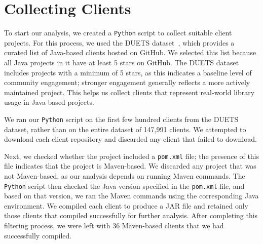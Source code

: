 \section{Collecting Clients}


To start our analysis, we created a \texttt{Python} script to collect suitable client projects. For this process, we used the DUETS dataset~\cite{durieux21:_duets}, which provides a curated list of Java-based clients hosted on GitHub. We selected this list because all Java projects in it have at least 5 stars on GitHub. The DUETS dataset includes projects with a minimum of 5 stars, as this indicates a baseline level of community engagement; stronger engagement generally reflects a more actively maintained project. This helps us collect clients that represent real-world library usage in Java-based projects.



We ran our \texttt{Python} script on the first few hundred clients from the DUETS dataset, rather than on the entire dataset of 147,991 clients. We attempted to download each client repository and discarded any client that failed to download. 

Next, we checked whether the project included a \texttt{pom.xml} file; the presence of this file indicates that the project is Maven-based. We discarded any project that was not Maven-based, as our analysis depends on running Maven commands. The \texttt{Python} script then checked the Java version specified in the \texttt{pom.xml} file, and based on that version, we ran the Maven commands using the corresponding Java environment. We compiled each client to produce a JAR file and retained only those clients that compiled successfully for further analysis. After completing this filtering process, we were left with 36 Maven-based clients that we had successfully compiled.


